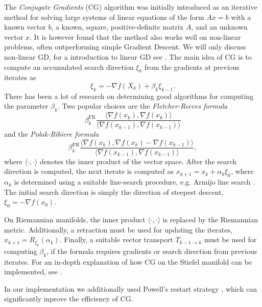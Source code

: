 The \textit{Conjugate Gradients} (CG) algorithm \cite{cite:introduction_to_CG_without_pain, cite:a_survey_of_nonlinear_CG_methods, cite:algorithm_CG_DESCENT_a_CG_method_with_guaranteed_descent} was initially introduced as an iterative method for solving large systems of linear equations of the form $Ax = b$ with a known vector $b$, a known, square, positive-definite matrix $A$, and an unknown vector $x$. It is however found that the method also works well on non-linear problems, often outperforming simple Gradient Descent. We will only discuss non-linear GD, for a introduction to linear GD see \cite{cite:introduction_to_CG_without_pain}. The main idea of CG is to compute an accumulated search direction $\xi_{k}$ from the gradients at previous iterates as
\begin{equation}
	\xi_k = -\nabla f(X_{k}) + \beta_{k} \xi_{k-1}.
\end{equation}
There has been a lot of research on determining good algorithms for computing the parameter $\beta_{k}$. Two popular choices are the \textit{Fletcher-Reeves formula} \cite{cite:optimization_on_matrix_manifolds}
\begin{equation}
	\beta_{k}^\text{FR}\frac{\langle\nabla f(x_{k}), \nabla f(x_{k})\rangle}{\langle\nabla f(x_{k-1}), \nabla f(x_{k-1})\rangle}
\end{equation}
and the \textit{Polak-Ribiere formula} \cite{cite:optimization_on_matrix_manifolds}
\begin{equation}
	\beta_{k}^\text{PR}\frac{\langle\nabla f(x_{k}), \nabla f(x_{k})-\nabla f(x_{k-1})\rangle}{\langle\nabla f(x_{k-1}), \nabla f(x_{k-1})\rangle},
\end{equation}
where $\langle\cdot,\cdot\rangle$ denotes the inner product of the vector space. After the search direction is computed, the next iterate is computed as $x_{k+1} = x_k + \alpha_k \xi_k$, where $\alpha_k$ is determined using a suitable line-search procedure, e.g. Armijo line search \cite{cite:optimization_on_matrix_manifolds}. The initial search direction is simply the direction of steepest descent, $\xi_0 = -\nabla f(x_0)$. \par
On Riemannian manifolds, the inner product $\langle\cdot,\cdot\rangle$ is replaced by the Riemannian metric. Additionally, a retraction must be used for updating the iterates, $x_{k+1} = R_{\xi_k}(\alpha_k)$. Finally, a suitable vector transport $T_{k-1\rightarrow k}$ must be used for computing $\beta_k$, if the formula requires gradients or search direction from previous iterates. For an in-depth explanation of how CG on the Stiefel manifold can be implemented, see \cite{cite:optimization_on_matrix_manifolds, cite:a_riemannian_CG_method_for_optimization_on_the_Stifel_manifold, cite:riemannian_optimization_isometric_tensor_networks}. \par
In our implementation we additionally used Powell's restart strategy \cite{cite:on_the_use_of_powells_restart_strategy, cite:a_survey_of_nonlinear_CG_methods, cite:pymanopt}, which can significantly inprove the efficiency of CG.